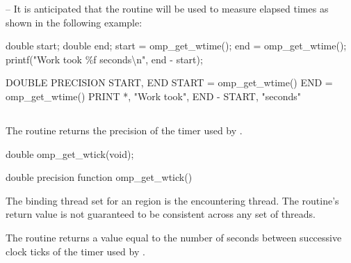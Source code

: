 \notestart
\noteheader – It is anticipated that the routine will be used to measure elapsed times as shown 
in the following example:

\ccppspecificstart
\begin{boxedcode}
double start;
double end;
start = omp\_get\_wtime();
end = omp\_get\_wtime();
printf("Work took \%f seconds{\textbackslash}n", end - start);
\end{boxedcode}
\ccppspecificend

\fortranspecificstart
\begin{boxedcode}
DOUBLE PRECISION START, END
START = omp\_get\_wtime()
END = omp\_get\_wtime()
PRINT *, "Work took", END - START, "seconds"
\end{boxedcode}
\fortranspecificend
\noteend










\pagebreak
\subsection{}
\label{subsec:omp_get_wtick}
\summary
The  routine returns the precision of the timer used by 
.

\format
\ccppspecificstart
\begin{boxedcode}
double omp\_get\_wtick(void);
\end{boxedcode}
\ccppspecificend

\fortranspecificstart
\begin{boxedcode}
double precision function omp\_get\_wtick()
\end{boxedcode}
\fortranspecificend

\binding
The binding thread set for an  region is the encountering thread. The 
routine’s return value is not guaranteed to be consistent across any set of threads.

\effect
The  routine returns a value equal to the number of seconds between 
successive clock ticks of the timer used by .



